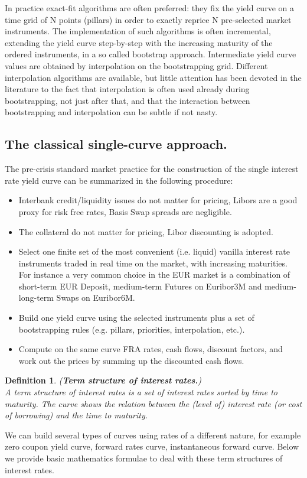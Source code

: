 \documentclass{book}
\newtheorem{definition}{Definition}[section]
\begin{document}
In practice exact-fit algorithms are often preferred: they fix the yield curve on a time grid of N points (pillars) in order to exactly reprice N pre-selected market instruments. The implementation of such algorithms is often incremental, extending the yield curve step-by-step with the increasing maturity of the ordered instruments, in a so called bootstrap approach. Intermediate yield curve values are obtained by interpolation on the bootstrapping grid. Different interpolation algorithms are available, but little attention has been devoted in the literature to the fact that interpolation is often used already during bootstrapping, not just after that, and that the interaction between bootstrapping and interpolation can be subtle if not nasty.

\subsection{The classical single-curve approach.}
The pre-crisis standard market practice for the construction of the single interest rate yield curve can be summarized in the following procedure:
\begin{itemize}
\item Interbank credit/liquidity issues do not matter for pricing, Libors are a good proxy for risk free rates, Basis Swap spreads are negligible.
\item The collateral do not matter for pricing, Libor discounting is adopted.
\item Select one finite set of the most convenient (i.e. liquid) vanilla interest rate instruments traded in real time on the market, with increasing maturities. For instance a very common choice in the EUR market is a combination of short-term EUR Deposit, medium-term Futures on Euribor3M and medium-long-term Swaps on Euribor6M.
\item Build one yield curve using the selected instruments plus a set of bootstrapping rules (e.g. pillars, priorities, interpolation, etc.).
\item Compute on the same curve FRA rates, cash flows, discount factors, and work out the prices by summing up the discounted cash flows.
\end{itemize} 
\begin{definition}(\textbf{Term structure of interest rates.})\\
A term structure of interest rates is a set of interest rates sorted by time to maturity. The curve shows the relation between the (level of)
interest rate (or cost of borrowing) and the time to maturity.
\end{definition}
We can build several types of curves using rates of a different nature, for example zero coupon yield curve, forward rates curve, instantaneous forward curve. Below we provide basic mathematics formulae to deal with these term structures of interest rates.
\end{document}
